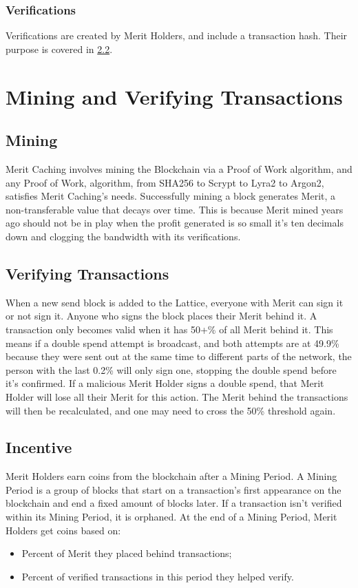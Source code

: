 \documentclass[14pt]{article}
\begin{document}
\label{sec:1.2.2}
\subsubsection{Verifications}
Verifications are created by Merit Holders, and include a transaction hash. Their purpose is covered in \hyperref[sec:2.2]{2.2}.

\newpage

\label{sec:2}
\section{Mining and Verifying Transactions}

\label{sec:2.1}
\subsection{Mining}
Merit Caching involves mining the Blockchain via a Proof of Work algorithm, and any Proof of Work, algorithm, from SHA256 to Scrypt to Lyra2 to Argon2, satisfies Merit Caching's needs. Successfully mining a block generates Merit, a non-transferable value that decays over time. This is because Merit mined years ago should not be in play when the profit generated is so small it's ten decimals down and clogging the bandwidth with its verifications.

\label{sec:2.2}
\subsection{Verifying Transactions}
When a new send block is added to the Lattice, everyone with Merit can sign it or not sign it. Anyone who signs the block places their Merit behind it. A transaction only becomes valid when it has 50+\% of all Merit behind it. This means if a double spend attempt is broadcast, and both attempts are at 49.9\% because they were sent out at the same time to different parts of the network, the person with the last 0.2\% will only sign one, stopping the double spend before it's confirmed. If a malicious Merit Holder signs a double spend, that Merit Holder will lose all their Merit for this action. The Merit behind the transactions will then be recalculated, and one may need to cross the 50\% threshold again.

\newpage

\label{sec:2.3}
\subsection{Incentive}
Merit Holders earn coins from the blockchain after a Mining Period. A Mining Period is a group of blocks that start on a transaction’s first appearance on the blockchain and end a fixed amount of blocks later. If a transaction isn’t verified within its Mining Period, it is orphaned. At the end of a Mining Period, Merit Holders get coins based on:
\begin{itemize}
\item Percent of Merit they placed behind transactions;
\item Percent of verified transactions in this period they helped verify.
\end{itemize}
\end{document}

